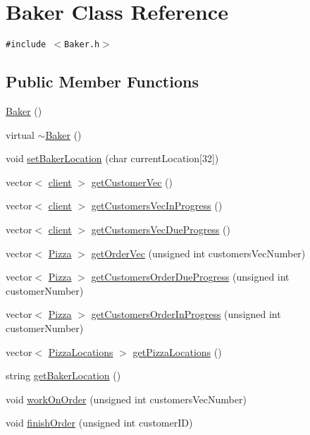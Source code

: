\hypertarget{class_baker}{
\section{Baker Class Reference}
\label{class_baker}
}
{\tt \#include $<$Baker.h$>$}

\subsection*{Public Member Functions}
\begin{CompactItemize}
\item 
\hyperlink{class_baker_e162daa1f48200ac1b0470ea143378af}{Baker} ()
\item 
virtual \hyperlink{class_baker_aca71cde6b6b1e6315b980d299ed63ba}{$\sim$Baker} ()
\item 
void \hyperlink{class_baker_b85151ecb20282d81b4dab489fea7dd8}{set\-Baker\-Location} (char current\-Location\mbox{[}32\mbox{]})
\item 
vector$<$ \hyperlink{classclient}{client} $>$ \hyperlink{class_baker_3970b0afe27b514282442b11592e1602}{get\-Customer\-Vec} ()
\item 
vector$<$ \hyperlink{classclient}{client} $>$ \hyperlink{class_baker_8b798f098bfd9a23b11fa1d63d089609}{get\-Customers\-Vec\-In\-Progress} ()
\item 
vector$<$ \hyperlink{classclient}{client} $>$ \hyperlink{class_baker_4c05936fa38e14b768511921a3288c57}{get\-Customers\-Vec\-Due\-Progress} ()
\item 
vector$<$ \hyperlink{class_pizza}{Pizza} $>$ \hyperlink{class_baker_ad0cbeddec394b25c5eade57247f4110}{get\-Order\-Vec} (unsigned int customers\-Vec\-Number)
\item 
vector$<$ \hyperlink{class_pizza}{Pizza} $>$ \hyperlink{class_baker_7c9256e53372bd3a698e40cf64003c50}{get\-Customers\-Order\-Due\-Progress} (unsigned int customer\-Number)
\item 
vector$<$ \hyperlink{class_pizza}{Pizza} $>$ \hyperlink{class_baker_96a7c1ec2dc23919a4e7ca8c399476e1}{get\-Customers\-Order\-In\-Progress} (unsigned int customer\-Number)
\item 
vector$<$ \hyperlink{class_pizza_locations}{Pizza\-Locations} $>$ \hyperlink{class_baker_3d38e7498fba59674c7d3838bf4c1824}{get\-Pizza\-Locations} ()
\item 
string \hyperlink{class_baker_363b0d0c242923ca3a76ebd4e608cc2d}{get\-Baker\-Location} ()
\item 
void \hyperlink{class_baker_9616413c80f3814907a9c2399ac50438}{work\-On\-Order} (unsigned int customers\-Vec\-Number)
\item 
void \hyperlink{class_baker_222a16bf113b70cbe0388a7291978a57}{finish\-Order} (unsigned int customer\-ID)
\end{CompactItemize}


